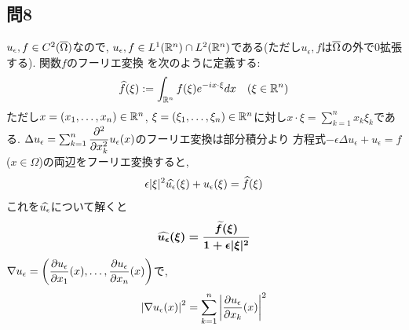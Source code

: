 \subsection{問8}
$u_{\epsilon}, f \in C^2(\overline{\Omega})$なので, $u_{\epsilon}, f \in L^1(\mathbb{R}^n)\cap L^2(\mathbb{R}^n)$である(ただし$u_{\epsilon}, f$は$\overline{\Omega}$の外で0拡張する). 関数$f$のフーリエ変換
を次のように定義する:
\[\widehat{f}(\xi) :=\int_{\mathbb{R}^n} f(\xi)e^{-ix \cdot \xi} dx\quad (\xi\in\mathbb{R}^n)\]
ただし$x=(x_1,\dots ,x_n)\in \mathbb{R}^n$, $\xi = (\xi_1,\dots, \xi_n)\in \mathbb{R}^n$に対し$x\cdot \xi = \sum_{k=1}^{n} x_k\xi_k$である. $\Delta u_{\epsilon} = \sum_{k=1}^{n} \dfrac{\partial^2}{\partial x_k^2} u_{\epsilon}(x)$のフーリエ変換は部分積分より
{\small
{}
方程式$-\epsilon \Delta u_{\epsilon} + u_{\epsilon} = f$ ($x\in \Omega$)の両辺をフーリエ変換すると,
\[\epsilon |\xi|^2 \widehat{u_{\epsilon}}(\xi) + u_{\epsilon}(\xi) = \widehat{f}(\xi)\]
これを$\widehat{u_{\epsilon}}$について解くと
\[{\mbox{\boldmath $\widehat{u_{\epsilon}}(\xi) = \dfrac{\widetilde{f}(\xi)}{1+\epsilon |\xi|^2 } $}}\]
}
$\nabla u_{\epsilon} = \left( \dfrac{\partial u_{\epsilon}}{\partial x_1}(x),\dots, \dfrac{\partial u_{\epsilon}}{\partial x_n}(x) \right)$で,
\[\left| \nabla u_{\epsilon}(x) \right|^2 = \sum_{k=1}^{n} \left| \dfrac{\partial u_{\epsilon}}{\partial x_k}(x) \right|^2 \]


